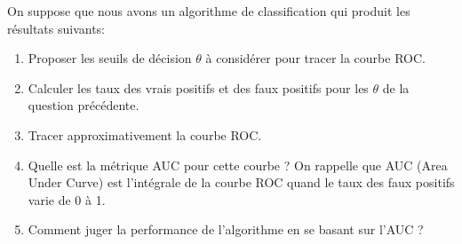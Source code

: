 \documentclass[]{../exercices}
\begin{document}
	\begin{exercice}
		On suppose que nous avons un algorithme de classification qui produit les résultats suivants:
		\begin{table}[h]
			\centering
		\end{table}
		\begin{enumerate}
			\item Proposer les seuils de décision $\theta$ à considérer pour tracer la courbe ROC.
			\item Calculer les taux des vrais positifs et des faux positifs pour les $\theta$ de la question précédente.
			\item Tracer approximativement la courbe ROC.
			\item Quelle est la métrique AUC pour cette courbe ? On rappelle que AUC (Area Under Curve) est l'intégrale de la courbe ROC quand le taux des faux positifs varie de 0 à 1.
			\item Comment juger la performance de l'algorithme en se basant sur l'AUC ?
		\end{enumerate}
	\end{exercice}
\end{document}
